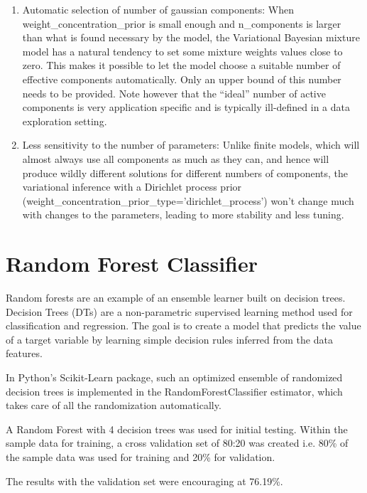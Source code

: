 \documentclass[a4paper,twoside,12pt]{report}
\begin{document}
\begin{enumerate}
\item Automatic selection of number of gaussian components:
 	When weight\_concentration\_prior is small enough and n\_components is larger than what is found necessary by the model, the Variational Bayesian mixture model has a natural tendency to set some mixture weights values close to zero. This makes it possible to let the model choose a suitable number of effective components automatically. Only an upper bound of this number needs to be provided. Note however that the “ideal” number of active components is very application specific and is typically ill-defined in a data exploration setting.

\item Less sensitivity to the number of parameters:
 	Unlike finite models, which will almost always use all components as much as they can, and hence will produce wildly different solutions for different numbers of components, the variational inference with a Dirichlet process prior (weight\_concentration\_prior\_type='dirichlet\_process') won’t change much with changes to the parameters, leading to more stability and less tuning.

\end{enumerate}

\section{Random Forest Classifier}

Random forests are an example of an ensemble learner built on decision trees. 
Decision Trees (DTs) are a non-parametric supervised learning method used for classification and regression. The goal is to create a model that predicts the value of a target variable by learning simple decision rules inferred from the data features.

In Python's Scikit-Learn package, such an optimized ensemble of randomized decision trees is implemented in the RandomForestClassifier estimator, which takes care of all the randomization automatically. 

A Random Forest with 4 decision trees was used for initial testing.        Within the sample data for training, a cross validation set of 80:20 was created i.e. 80\% of the sample data was used for training and 20\% for validation. 

The results with the validation set were encouraging at 76.19\%.   
\end{document}

